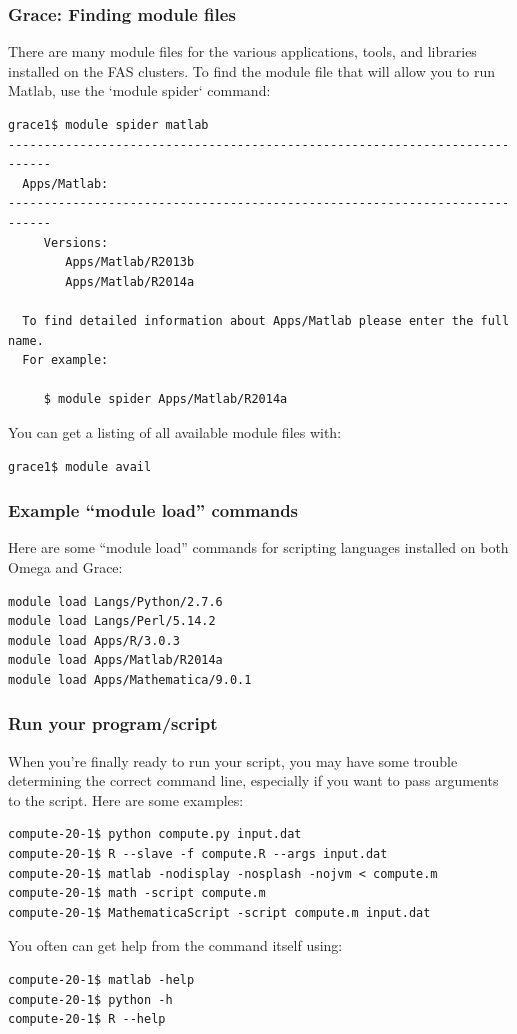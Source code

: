 \documentclass[10pt]{beamer}
\begin{document}
\begin{frame}[fragile]
\frametitle{Grace: Finding module files}
There are many module files for the various applications, tools, and
libraries installed on the FAS clusters.  To find the module file that
will allow you to run Matlab, use the `module spider` command:

\begin{verbatim}
grace1$ module spider matlab
----------------------------------------------------------------------------
  Apps/Matlab:
----------------------------------------------------------------------------
     Versions:
        Apps/Matlab/R2013b
        Apps/Matlab/R2014a

  To find detailed information about Apps/Matlab please enter the full name.
  For example:

     $ module spider Apps/Matlab/R2014a
\end{verbatim}

You can get a listing of all available module files with:
\begin{verbatim}
grace1$ module avail
\end{verbatim}
\end{frame}

\begin{frame}[fragile]
\frametitle{Example ``module load'' commands}
Here are some ``module load'' commands for scripting languages
installed on both Omega and Grace:

\begin{verbatim}
module load Langs/Python/2.7.6
module load Langs/Perl/5.14.2
module load Apps/R/3.0.3
module load Apps/Matlab/R2014a
module load Apps/Mathematica/9.0.1
\end{verbatim}
\end{frame}

\begin{frame}[fragile]
\frametitle{Run your program/script}
When you're finally ready to run your script, you may have some
trouble determining the correct command line, especially if you want to
pass arguments to the script.  Here are some examples:

\begin{verbatim}
compute-20-1$ python compute.py input.dat
compute-20-1$ R --slave -f compute.R --args input.dat
compute-20-1$ matlab -nodisplay -nosplash -nojvm < compute.m
compute-20-1$ math -script compute.m
compute-20-1$ MathematicaScript -script compute.m input.dat
\end{verbatim}

You often can get help from the command itself using:

\begin{verbatim}
compute-20-1$ matlab -help
compute-20-1$ python -h
compute-20-1$ R --help
\end{verbatim}
\end{frame}
\end{document}
